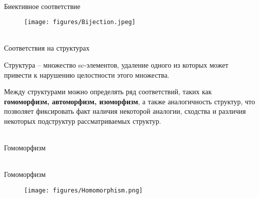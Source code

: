 \begin{frame}{\\Биективное соответствие}
    \topline
    \begin{center}
        \begin{figure}[Hb]
            \centering
            \texttt{[image: figures/Bijection.jpeg]}
        \end{figure}
    \end{center}
\end{frame}

\begin{frame}{\\Соответствия на структурах}
\topline
\fontsize{10}{12}\selectfont
\begin{SCn}
Структура – множество sc-элементов, удаление одного из которых может привести к нарушению целостности этого множества.

Между структурами можно определять ряд соответствий, таких как \textbf{гомоморфизм, автоморфизм, изоморфизм}, а также аналогичность структур, что позволяет фиксировать факт наличия некоторой аналогии,
сходства и различия некоторых подструктур рассматриваемых структур.
\end{SCn}
\end{frame}

\begin{frame}{\\Гомоморфизм}
\topline
\fontsize{10}{12}\selectfont
\begin{SCn}

\end{SCn}
\end{frame}

\begin{frame}{\\Гомоморфизм}
    \topline
    \begin{center}
        \begin{figure}[b]
            \centering
            \texttt{[image: figures/Homomorphism.png]}
        \end{figure}
    \end{center}
\end{frame}

